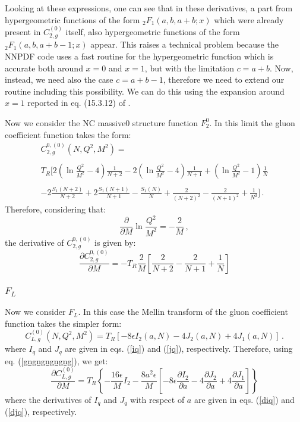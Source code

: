 \documentclass[10pt,a4paper]{article}
\begin{document}
Looking at these expressions, one can see that in these derivatives, a part from hypergeometric functions of the form ${_2F_1(a,b,a+b;x)}$ which were already present in $C_{2,g}^{(0)}$ itself, also hypergeometric functions of the form ${_2F_1(a,b,a+b-1;x)}$ appear. This raises a technical problem because the NNPDF code uses a fast routine for the hypergeometric function which is accurate both around $x=0$ and $x=1$, but with the limitation $c=a+b$. Now, instead, we need also the case ${c=a+b-1}$, therefore we need to extend our routine including this possibility. We can do this using the expansion around $x=1$ reported in eq. (15.3.12) of \cite{AbramowitzStegun}.

Now we consider the NC massive0 structure function $F_2^0$. In this limit the gluon coefficient function takes the form:
\begin{equation}
\begin{array}{c}
\displaystyle C_{2,g}^{0,(0)}(N,Q^2,M^2)=\\
\\
\displaystyle T_R\Bigg[2\left(\ln\frac{Q^2}{M^2}-4\right)\frac1{N+2}-2\left(\ln\frac{Q^2}{M^2}-4\right)\frac1{N+1}+\left(\ln\frac{Q^2}{M^2}-1\right)\frac1N\\
\\
\displaystyle -2\frac{S_1(N+2)}{N+2}+2\frac{S_1(N+1)}{N+1}-\frac{S_1(N)}{N}+\frac2{(N+2)^2}-\frac2{(N+1)^2}+\frac1{N^2}\Bigg]\,.
\end{array}
\end{equation}
Therefore, considering that:
\begin{equation}
\frac{\partial}{\partial M} \ln\frac{Q^2}{M^2} = - \frac2M\,,
\end{equation}
the derivative of $C_{2,g}^{0,(0)}$ is given by:
\begin{equation}
\frac{\partial C_{2,g}^{0,(0)}}{\partial M}= -T_R\frac{2}{M}\left[\frac2{N+2}-\frac2{N+1}+\frac1N\right]
\end{equation}

\subsubsection{$F_L$}

Now we consider $F_L$. In this case the Mellin transform of the gluon coefficient function takes the simpler form:
\begin{equation}\label{cgnf1L}
C_{L,g}^{(0)}\left(N,Q^2,M^2\right)= T_R\left[-8\epsilon I_2(a,N)-4J_2(a,N)+4J_1(a,N)\right]\,.
\end{equation}
where $I_q$ and $J_q$ are given in eqs. (\ref{iq}) and (\ref{jq}), respectively. Therefore, using eq. (\ref{gngngngngng}), we get:
\begin{equation}
\frac{\partial C_{L,g}^{(0)}}{\partial M}= T_R\left\{-\frac{16\epsilon}{M} I_2 -\frac{8a^2\epsilon}{M}\left[-8\epsilon \frac{\partial I_2}{\partial a}-4\frac{\partial J_2}{\partial a}+4\frac{\partial J_1}{\partial a}\right]\right\}
\end{equation}
where the derivatives of $I_q$ and $J_q$ with respect of $a$ are given in eqs. (\ref{diq}) and (\ref{djq}), respectively.
\end{document}
